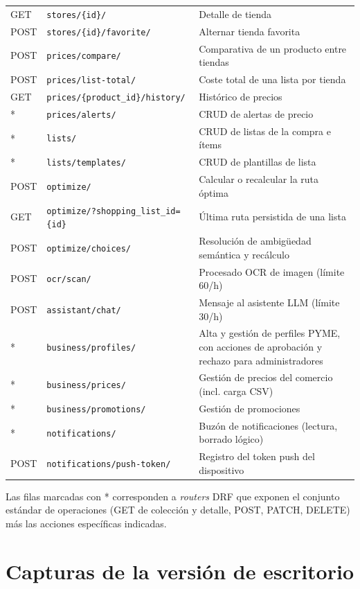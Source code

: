 \begin{small}
\begin{longtable}{@{}llp{6.4cm}@{}}
GET & \texttt{stores/\{id\}/} & Detalle de tienda \\
POST & \texttt{stores/\{id\}/favorite/} & Alternar tienda favorita \\
\midrule
POST & \texttt{prices/compare/} & Comparativa de un producto entre tiendas \\
POST & \texttt{prices/list-total/} & Coste total de una lista por tienda \\
GET & \texttt{prices/\{product\_id\}/history/} & Histórico de precios \\
* & \texttt{prices/alerts/} & CRUD de alertas de precio \\
\midrule
* & \texttt{lists/} & CRUD de listas de la compra e ítems \\
* & \texttt{lists/templates/} & CRUD de plantillas de lista \\
\midrule
POST & \texttt{optimize/} & Calcular o recalcular la ruta óptima \\
GET & \texttt{optimize/?shopping\_list\_id=\{id\}} & Última ruta persistida de una lista \\
POST & \texttt{optimize/choices/} & Resolución de ambigüedad semántica y recálculo \\
\midrule
POST & \texttt{ocr/scan/} & Procesado OCR de imagen (límite 60/h) \\
\midrule
POST & \texttt{assistant/chat/} & Mensaje al asistente LLM (límite 30/h) \\
\midrule
* & \texttt{business/profiles/} & Alta y gestión de perfiles PYME, con acciones de aprobación y rechazo para administradores \\
* & \texttt{business/prices/} & Gestión de precios del comercio (incl. carga CSV) \\
* & \texttt{business/promotions/} & Gestión de promociones \\
\midrule
* & \texttt{notifications/} & Buzón de notificaciones (lectura, borrado lógico) \\
POST & \texttt{notifications/push-token/} & Registro del token push del dispositivo \\
\end{longtable}
\end{small}

Las filas marcadas con * corresponden a \emph{routers} DRF que exponen el conjunto estándar de
operaciones (GET de colección y detalle, POST, PATCH, DELETE) más las acciones espec\'ificas
indicadas.

\clearpage

\chapter{Capturas de la versión de escritorio}\label{apendice-capturas-web}

